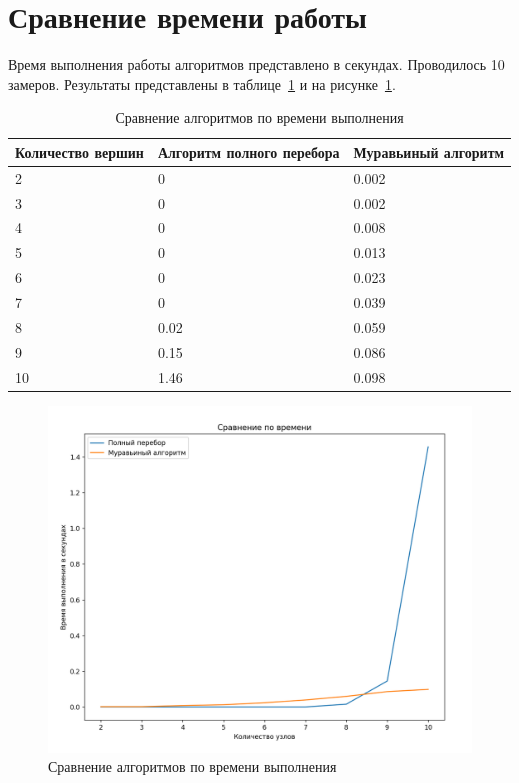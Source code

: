 \documentclass[a4paper, 12pt]{extreport}
\begin{document}
\section{Сравнение времени работы}

Время выполнения работы алгоритмов представлено в секундах. Проводилось 10 замеров. Результаты представлены в 
таблице~\ref{tbl:all_time_cmp} и на рисунке~\ref{graph}.

\begin{table}[h]
	\begin{center}
	\caption{\label{tbl:all_time_cmp} Сравнение алгоритмов по времени выполнения}
	\begin{tabular}{|l|l|l|}
		\hline
		Количество вершин & Алгоритм полного перебора & Муравьиный алгоритм \\ 
		\hline
		2 & 0 & 0.002 \\ 
		\hline
		3 & 0 & 0.002 \\ 
		\hline
		4 & 0 & 0.008 \\ 
		\hline
		5 & 0 & 0.013 \\ 
		\hline
		6 & 0 & 0.023 \\ 
		\hline
		7 & 0 & 0.039 \\ 
		\hline
		8 & 0.02 & 0.059 \\ 
		\hline
		9 & 0.15 & 0.086 \\ 
		\hline
		10 & 1.46 & 0.098 \\ 
		\hline
	\end{tabular}
	\end{center}
\end{table}

\clearpage\begin{figure}[h]
	\centering
	\includegraphics[scale=0.7]{tools/graph.png}
	\caption{Сравнение алгоритмов по времени выполнения}
	\label{graph}
\end{figure}
\end{document}
